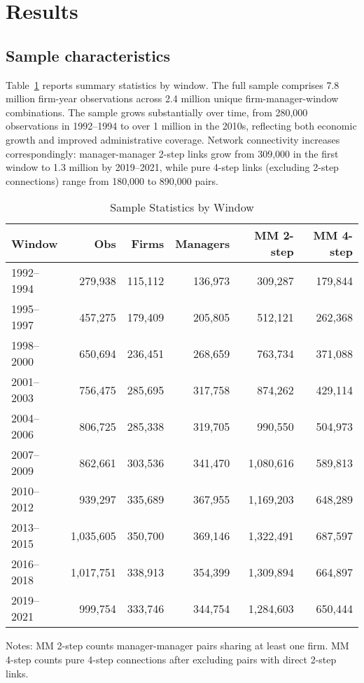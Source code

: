 \documentclass[11pt]{article}
\begin{document}
\section{Results}
\label{sec:results}

\subsection{Sample characteristics}
Table~\ref{tab:sample-stats} reports summary statistics by window. The full sample comprises 7.8 million firm-year observations across 2.4 million unique firm-manager-window combinations. The sample grows substantially over time, from 280,000 observations in 1992--1994 to over 1 million in the 2010s, reflecting both economic growth and improved administrative coverage. Network connectivity increases correspondingly: manager-manager 2-step links grow from 309,000 in the first window to 1.3 million by 2019--2021, while pure 4-step links (excluding 2-step connections) range from 180,000 to 890,000 pairs.

\begin{table}[t]
\centering
\caption{Sample Statistics by Window}
\label{tab:sample-stats}
\begin{threeparttable}
\begin{tabular}{lrrrrr}
\toprule
Window & Obs & Firms & Managers & MM 2-step & MM 4-step \\
\midrule
1992--1994 & 279,938 & 115,112 & 136,973 & 309,287 & 179,844 \\
1995--1997 & 457,275 & 179,409 & 205,805 & 512,121 & 262,368 \\
1998--2000 & 650,694 & 236,451 & 268,659 & 763,734 & 371,088 \\
2001--2003 & 756,475 & 285,695 & 317,758 & 874,262 & 429,114 \\
2004--2006 & 806,725 & 285,338 & 319,705 & 990,550 & 504,973 \\
2007--2009 & 862,661 & 303,536 & 341,470 & 1,080,616 & 589,813 \\
2010--2012 & 939,297 & 335,689 & 367,955 & 1,169,203 & 648,289 \\
2013--2015 & 1,035,605 & 350,700 & 369,146 & 1,322,491 & 687,597 \\
2016--2018 & 1,017,751 & 338,913 & 354,399 & 1,309,894 & 664,897 \\
2019--2021 & 999,754 & 333,746 & 344,754 & 1,284,603 & 650,444 \\
\bottomrule
\end{tabular}
\begin{tablenotes}
\footnotesize
\item Notes: MM 2-step counts manager-manager pairs sharing at least one firm. MM 4-step counts pure 4-step connections after excluding pairs with direct 2-step links.
\end{tablenotes}
\end{threeparttable}
\end{table}
\end{document}
